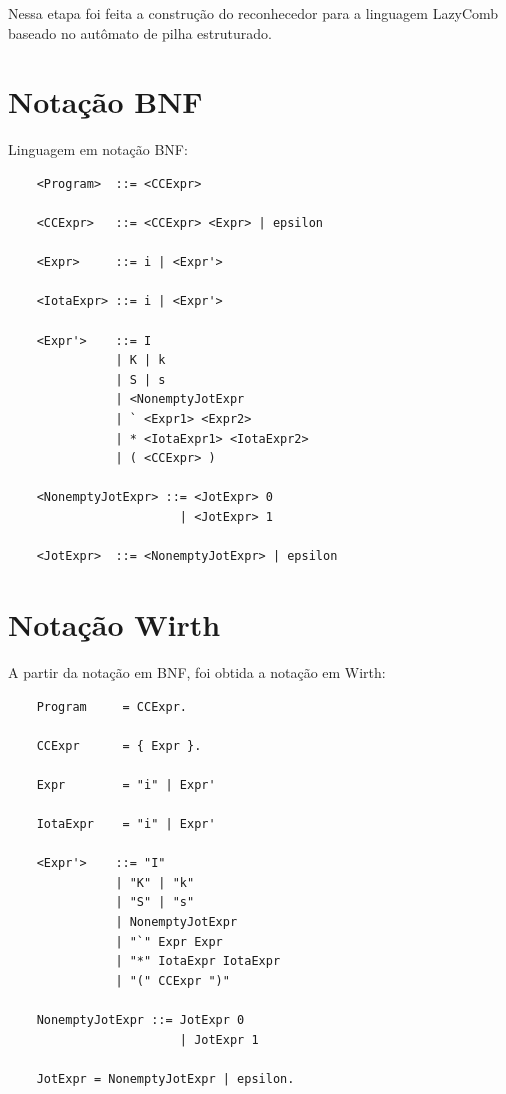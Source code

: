 \label{Cap:construcao-reconhecedor}

Nessa etapa foi feita a construção do reconhecedor para a linguagem LazyComb baseado no autômato de pilha estruturado.

\section{Notação BNF}
\label{sec:notacao-bnf}

Linguagem em notação BNF:

\begin{lstlisting}
    <Program>  ::= <CCExpr>     
                    
    <CCExpr>   ::= <CCExpr> <Expr> | epsilon                   

    <Expr>     ::= i | <Expr'>                      

    <IotaExpr> ::= i | <Expr'>

    <Expr'>    ::= I                        
               | K | k                  
               | S | s                               
               | <NonemptyJotExpr           
               | ` <Expr1> <Expr2>            
               | * <IotaExpr1> <IotaExpr2>    
               | ( <CCExpr> )             

    <NonemptyJotExpr> ::= <JotExpr> 0                
                        | <JotExpr> 1                

    <JotExpr>  ::= <NonemptyJotExpr> | epsilon

\end{lstlisting}

\section{Notação Wirth}

A partir da notação em BNF, foi obtida a notação em Wirth:

\begin{lstlisting}
    Program     = CCExpr.     
                    
    CCExpr      = { Expr }.                  

    Expr        = "i" | Expr'                      

    IotaExpr    = "i" | Expr'

    <Expr'>    ::= "I"                        
               | "K" | "k"                  
               | "S" | "s"                               
               | NonemptyJotExpr           
               | "`" Expr Expr       
               | "*" IotaExpr IotaExpr    
               | "(" CCExpr ")"             

    NonemptyJotExpr ::= JotExpr 0                
                        | JotExpr 1     

    JotExpr = NonemptyJotExpr | epsilon.           
\end{lstlisting}

